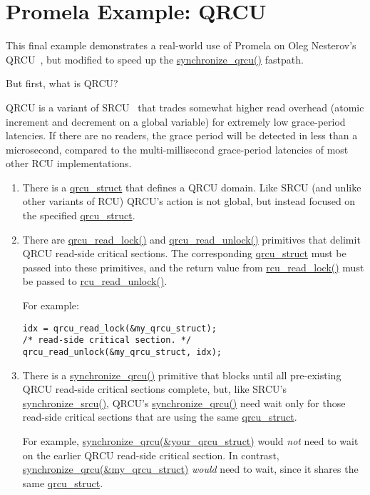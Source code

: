 \section{Promela Example: QRCU}
\label{app:formal:Promela Example: QRCU}

This final example demonstrates a real-world use of Promela on Oleg
Nesterov's
QRCU~\cite{OlegNesterov2006QRCU,OlegNesterov2006aQRCU},
but modified to speed up the \url{synchronize_qrcu()}
fastpath.

But first, what is QRCU?

QRCU is a variant of SRCU~\cite{PaulEMcKenney2006c}
that trades somewhat higher read overhead
(atomic increment and decrement on a global variable) for extremely
low grace-period latencies.
If there are no readers, the grace period will be detected in less
than a microsecond, compared to the multi-millisecond grace-period
latencies of most other RCU implementations.

\begin{enumerate}
\item	There is a \url{qrcu_struct} that defines a QRCU domain.
	Like SRCU (and unlike other variants of RCU) QRCU's action
	is not global, but instead focused on the specified
	\url{qrcu_struct}.
\item	There are \url{qrcu_read_lock()} and \url{qrcu_read_unlock()}
	primitives that delimit QRCU read-side critical sections.
	The corresponding \url{qrcu_struct} must be passed into
	these primitives, and the return value from \url{rcu_read_lock()}
	must be passed to \url{rcu_read_unlock()}.

	For example:

\vspace{5pt}
\begin{minipage}[t]{\columnwidth}
\begin{verbatim}
idx = qrcu_read_lock(&my_qrcu_struct);
/* read-side critical section. */
qrcu_read_unlock(&my_qrcu_struct, idx);
\end{verbatim}
\end{minipage}
\vspace{5pt}

\item	There is a \url{synchronize_qrcu()} primitive that blocks until
	all pre-existing QRCU read-side critical sections complete,
	but, like SRCU's \url{synchronize_srcu()}, QRCU's
	\url{synchronize_qrcu()} need wait only for those read-side
	critical sections that are using the same \url{qrcu_struct}.
	
	For example, \url{synchronize_qrcu(&your_qrcu_struct)}
	would \emph{not} need to wait on the earlier QRCU read-side
	critical section.
	In contrast, \url{synchronize_qrcu(&my_qrcu_struct)}
	\emph{would} need to wait, since it shares the same
	\url{qrcu_struct}.
\end{enumerate}

